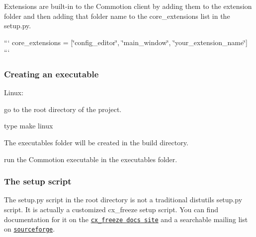 Extensions are built-\/in to the Commotion client by adding them to the extension folder and then adding that folder name to the core\+\_\+extensions list in the setup.\+py.

``` core\+\_\+extensions = \mbox{[}\char`\"{}config\+\_\+editor\char`\"{}, \char`\"{}main\+\_\+window\char`\"{}, \char`\"{}your\+\_\+extension\+\_\+name\char`\"{}\mbox{]} ```

\subsubsection*{Creating an executable}

Linux\+:
\begin{DoxyItemize}
\item go to the root directory of the project.
\item type {\ttfamily make linux}
\item The executables folder will be created in the build directory.
\item run the {\ttfamily Commotion} executable in the executables folder.
\end{DoxyItemize}

\subsubsection*{The setup script}

The setup.\+py script in the root directory is not a traditional distutils setup.\+py script. It is actually a customized cx\+\_\+freeze setup script. You can find documentation for it on the \href{http://cx-freeze.readthedocs.org/en/latest/distutils.html}{\tt cx\+\_\+freeze docs site} and a searchable mailing list on \href{http://sourceforge.net/p/cx-freeze/mailman/cx-freeze-users/}{\tt sourceforge}. 